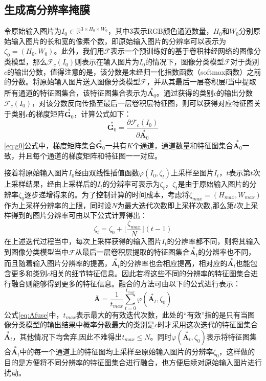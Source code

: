 \subsection{生成高分辨率掩膜}
令原始输入图片为$I_0 \in \mathbb{R}^{3\times H_0 \times W_0}$，其中3表示RGB颜色通道数量，$H_0$和$W_0$分别原始输入图片的长和宽的像素个数，即原始输入图片的分辨率可以表示为$\zeta_0=(H_0,W_0)$。此外，我们用$\mathcal{F}$表示一个预训练好的基于卷积神经网络的图像分类模型，那么$\mathcal{F}_c(I_0)$则表示在输入图片为$I_0$的情况下，图像分类模型$\mathcal{F}$对于类别$c$的输出分数，值得注意的是，该分数是未经归一化指数函数（softmax函数）之前的分数。将原始输入图片送入图像分类模型$\mathcal{F}$，并从其最后一层卷积层$l$当中提取所有通道的特征图集合，该特征图集合表示为$\overset{*}{\boldsymbol{A}_0}$。通过获得的类别$c$的输出分数$\mathcal{F}_c(I_0)$，对该分数反向传播至最后一层卷积层特征图，则可以获得对应特征图关于类别$c$的梯度矩阵$\overset{*}{\boldsymbol{G}_0}$，计算公式如下：
\begin{equation}
\overset{*}{\boldsymbol{G}_0}=\frac{\partial \mathcal{F}_c(I_0)}{\partial \overset{*}{\boldsymbol{A}_0}}
\label{eq:g0}
\end{equation}
\ref{eq:g0}公式中，梯度矩阵集合$\overset{*}{\boldsymbol{G}_0}$一共有$K$个通道，通道数量和特征图集合$\overset{*}{\boldsymbol{A}_0}$一致，并且每个通道的梯度矩阵和特征图一一对应。 

接着将原始输入图片$I_0$经由双线性插值函数$\varphi(I_0,\zeta_t)$上采样至图片$I_t$，$t$表示第$t$次上采样结果，经由上采样后的$I_t$的分辨率可表示为$\zeta_t$，$\zeta_t$是由于原始输入图片的分辨率$\zeta_0$逐步递增得来的。为了控制计算的时间成本，考虑将$\zeta_{max}=(H_{max},W_{max})$作为上采样分辨率的上限，同时设$N$为最大迭代次数即上采样次数,那么第$t$次上采样得到的图片分辨率可由以下公式计算得出：
\begin{equation}
	\zeta_t=\zeta_0 +\lfloor\frac{\zeta_{max}}{N}\rfloor(t-1)
\end{equation}
在上述迭代过程当中，每次上采样获得的输入图片$I_t$的分辨率都不同，则将其输入到图像分类模型当中$\mathcal{F}$从最后一层卷积层提取的特征图集合$\overset{*}{\boldsymbol{A}_t}$的分辨率也不同，而且随着输入图片分辨率的提高，$\overset{*}{\boldsymbol{A}_t}$的分辨率也会相应提高，相对应的$\overset{*}{\boldsymbol{A}_t}$也能包含更多和类别$c$相关的细节特征信息。因此若将这些不同的分辨率的特征图集合进行融合则能够得到更多的特征信息。融合的方法可由以下的公式进行表示：
\begin{equation}
	\overline{\bm{A}}=\frac{1}{t_{max}}\sum_{t=0}^{t_{max}}\varphi(\overset{*}{\boldsymbol{A}_t},\zeta_0)
	\label{eq:Afuse}
\end{equation}
公式\ref{eq:Afuse}中，$t_{max}$表示最大的有效迭代次数，此处的“有效”指的是只有当图像分类模型的输出结果中概率分数最大的类别是$c$时才采用这次迭代的特征图集合$\overset{*}{\boldsymbol{A}_t}$，其他情况下均舍弃,因此不难得出$t_{max} \leq N$。同时$\varphi(\overset{*}{\boldsymbol{A}_t},\zeta_0)$表示将特征图集合$\overset{*}{\boldsymbol{A}_t}$中的每一个通道上的特征图均上采样至原始输入图片的分辨率$\zeta_0$，这样做的目的是方便将不同分辨率的特征图集合进行融合，也方便后续对原始输入图片进行扰动。

